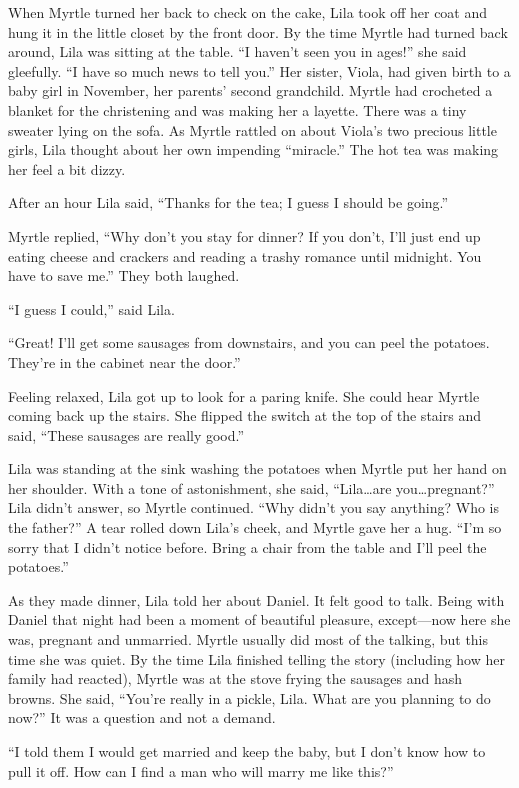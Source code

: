 \documentclass[
  american,
  letterpaper,
]{book}
\begin{document}
When Myrtle turned her back to check on the cake, Lila took off her coat
and hung it in the little closet by the front door. By the time Myrtle
had turned back around, Lila was sitting at the table. ``I haven't seen
you in ages!'' she said gleefully. ``I have so much news to tell you.''
Her sister, Viola, had given birth to a baby girl in November, her
parents' second grandchild. Myrtle had crocheted a blanket for the
christening and was making her a layette. There was a tiny sweater lying
on the sofa. As Myrtle rattled on about Viola's two precious little
girls, Lila thought about her own impending ``miracle.'' The hot tea was
making her feel a bit dizzy.

After an hour Lila said, ``Thanks for the tea; I guess I should be
going.''

Myrtle replied, ``Why don't you stay for dinner? If you don't, I'll just
end up eating cheese and crackers and reading a trashy romance until
midnight. You have to save me.'' They both laughed.

``I guess I could,'' said Lila.

``Great! I'll get some sausages from downstairs, and you can peel the
potatoes. They're in the cabinet near the door.''

Feeling relaxed, Lila got up to look for a paring knife. She could hear
Myrtle coming back up the stairs. She flipped the switch at the top of
the stairs and said, ``These sausages are really good.''

Lila was standing at the sink washing the potatoes when Myrtle put her
hand on her shoulder. With a tone of astonishment, she said,
``Lila\ldots are you\ldots pregnant?'' Lila didn't answer, so Myrtle
continued. ``Why didn't you say anything? Who is the father?'' A tear
rolled down Lila's cheek, and Myrtle gave her a hug. ``I'm so sorry that
I didn't notice before. Bring a chair from the table and I'll peel the
potatoes.''

As they made dinner, Lila told her about Daniel. It felt good to talk.
Being with Daniel that night had been a moment of beautiful pleasure,
except---now here she was, pregnant and unmarried. Myrtle usually did
most of the talking, but this time she was quiet. By the time Lila
finished telling the story (including how her family had reacted),
Myrtle was at the stove frying the sausages and hash browns. She said,
``You're really in a pickle, Lila. What are you planning to do now?'' It
was a question and not a demand.

``I told them I would get married and keep the baby, but I don't know
how to pull it off. How can I find a man who will marry me like this?''
\end{document}
